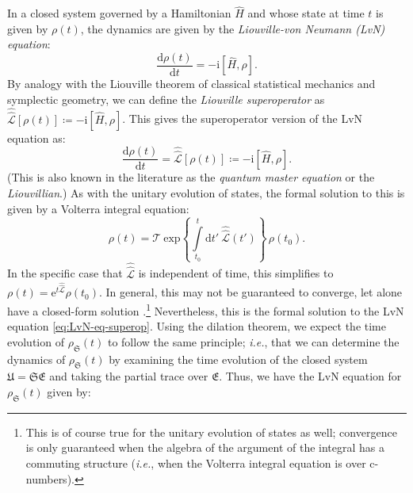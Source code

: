 \documentclass[preprints,article,accept,moreauthors,pdftex]{Definitions/mdpi}
\begin{document}
\begin{paracol}{2}
In a closed system governed by a Hamiltonian $\widehat{H}$ and whose state at time $t$ is given by $\rho\left(t\right)$, the dynamics are given by the \emph{Liouville-von Neumann (LvN) equation}:
\begin{equation}
    \label{eq:closed-LvN-eq}
    \frac{\mathrm{d}\rho\left(t\right)}{\mathrm{d}t} = -\mathrm{i}\left[\widehat{H},\rho\right].
\end{equation}
By analogy with the Liouville theorem of classical statistical mechanics and symplectic geometry, we can define \cite{Breuer07,Banerjee18} the \emph{Liouville superoperator} as $\hat{\hat{\mathcal{L}}}\left[\rho\left(t\right)\right] \coloneqq -\mathrm{i}\left[\widehat{H},\rho\right]$. This gives the superoperator version of the LvN equation as:
\begin{equation}
    \label{eq:LvN-eq-superop}
    \frac{\mathrm{d}\rho\left(t\right)}{\mathrm{d}t} = \hat{\hat{\mathcal{L}}}\left[\rho\left(t\right)\right] \coloneqq -\mathrm{i}\left[\widehat{H},\rho\right].
\end{equation}
(This is also known in the literature as the \emph{quantum master equation} or the \emph{Liouvillian}.) As with the unitary evolution of states, the formal solution to this is given by a Volterra integral equation:
\begin{equation}
    \label{eq:LvN-formal-sol}
    \rho\left(t\right) = \mathcal{T}\:\mathrm{exp}\left\{\int\limits_{t_{0}}^{t}\mathrm{d}t'\:\hat{\hat{\mathcal{L}}}\left(t'\right)\right\}\,\rho\left(t_{0}\right).
\end{equation}
In the specific case that $\hat{\hat{\mathcal{L}}}$ is independent of time, this simplifies to $\rho\left(t\right) = \mathrm{e}^{t\hat{\hat{\mathcal{L}}}}\rho\left(t_{0}\right)$. In general, this may not be guaranteed to converge, let alone have a closed-form solution \cite{BBP04,BGM06,Ivanov15}.\footnote{This is of course true for the unitary evolution of states as well; convergence is only guaranteed when the algebra of the argument of the integral has a commuting structure (\emph{i.e.}, when the Volterra integral equation is over c-numbers).} Nevertheless, this is the formal solution to the LvN equation \eqref{eq:LvN-eq-superop}. Using the dilation theorem, we expect the time evolution of $\rho_{\mathfrak{S}}\left(t\right)$ to follow the same principle; \emph{i.e.}, that we can determine the dynamics of $\rho_{\mathfrak{S}}\left(t\right)$ by examining the time evolution of the closed system $\mathfrak{U} = \mathfrak{SE}$ and taking the partial trace over $\mathfrak{E}$. Thus, we have the LvN equation for $\rho_{\mathfrak{S}}\left(t\right)$ given by:

\end{paracol}
\end{document}
